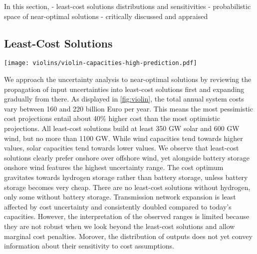 In this section,
- least-cost solutions distributions and sensitivities
- probabilistic space of near-optimal solutions
- critically discussed and appraised

\subsection{Least-Cost Solutions}

\begin{SCfigure}
    \texttt{[image: violins/violin-capacities-high-prediction.pdf]}
    \caption{
      Distribution of total system cost, generation, storage, and transmission capacities
      for least-cost solutions.
    }
    \label{fig:violin}
\end{SCfigure}

We approach the uncertainty analysis to near-optimal solutions
by reviewing the propagation of input uncertainties into 
least-cost solutions first and expanding gradually from there.
As displayed in \cref{fig:violin},
the total annual system costs vary between 160 and 220 billion Euro per year.
This means the most pessimistic cost projections
entail about 40\% higher cost than the most optimistic projections.
All least-cost solutions build at least 350 GW solar and 600 GW wind, but no more than 1100 GW.
While wind capacities tend towards higher values, solar capacities tend towards lower values.
We observe that least-cost solutions clearly prefer onshore over offshore wind, yet
alongside battery storage onshore wind features the highest uncertainty range.
The cost optimum gravitates towards hydrogen storage rather than battery storage,
unless battery storage becomes very cheap.
There are no least-cost solutions without hydrogen, only some without battery storage.
Transmission network expansion is least affected by cost uncertainty and consistently
doubled compared to today's capacities.
However, the interpretation of the observed ranges is limited because
they are not robust when we look beyond the least-cost solutions and allow marginal cost penalties.
Morover, the distribution of outputs does not yet convey information about their sensitivity to cost assumptions. 


